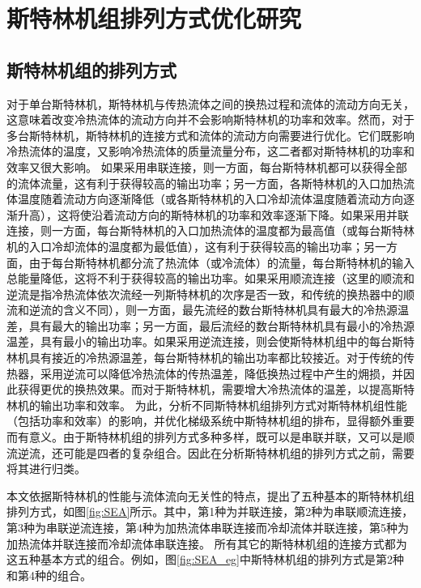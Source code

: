\chapter{斯特林机组排列方式优化研究}
\label{cha:optSEA}

\section{斯特林机组的排列方式}
\label{sec:connectionTypes}
对于单台斯特林机，斯特林机与传热流体之间的换热过程和流体的流动方向无关，这意味着改变冷热流体的流动方向并不会影响斯特林机的功率和效率。然而，对于多台斯特林机，斯特林机的连接方式和流体的流动方向需要进行优化。它们既影响冷热流体的温度，又影响冷热流体的质量流量分布，这二者都对斯特林机的功率和效率又很大影响。
如果采用串联连接，则一方面，每台斯特林机都可以获得全部的流体流量，这有利于获得较高的输出功率；另一方面，各斯特林机的入口加热流体温度随着流动方向逐渐降低（或各斯特林机的入口冷却流体温度随着流动方向逐渐升高），这将使沿着流动方向的斯特林机的功率和效率逐渐下降。如果采用并联连接，则一方面，每台斯特林机的入口加热流体的温度都为最高值（或每台斯特林机的入口冷却流体的温度都为最低值），这有利于获得较高的输出功率；另一方面，由于每台斯特林机都分流了热流体（或冷流体）的流量，每台斯特林机的输入总能量降低，这将不利于获得较高的输出功率。如果采用顺流连接（这里的顺流和逆流是指冷热流体依次流经一列斯特林机的次序是否一致，和传统的换热器中的顺流和逆流的含义不同），则一方面，最先流经的数台斯特林机具有最大的冷热源温差，具有最大的输出功率；另一方面，最后流经的数台斯特林机具有最小的冷热源温差，具有最小的输出功率。如果采用逆流连接，则会使斯特林机组中的每台斯特林机具有接近的冷热源温差，每台斯特林机的输出功率都比较接近。对于传统的传热器，采用逆流可以降低冷热流体的传热温差，降低换热过程中产生的㶲损，并因此获得更优的换热效果。而对于斯特林机，需要增大冷热流体的温差，以提高斯特林机的输出功率和效率。
为此，分析不同斯特林机组排列方式对斯特林机组性能（包括功率和效率）的影响，并优化梯级系统中斯特林机组的排布，显得额外重要而有意义。由于斯特林机组的排列方式多种多样，既可以是串联并联，又可以是顺流逆流，还可能是四者的复杂组合。因此在分析斯特林机组的排列方式之前，需要将其进行归类。

本文依据斯特林机的性能与流体流向无关性的特点，提出了五种基本的斯特林机组排列方式，如图\ref{fig:SEA}所示。其中，第1种为并联连接，第2种为串联顺流连接，第3种为串联逆流连接，第4种为加热流体串联连接而冷却流体并联连接，第5种为加热流体并联连接而冷却流体串联连接。
所有其它的斯特林机组的连接方式都为这五种基本方式的组合。例如，图\ref{fig:SEA_eg}中斯特林机组的排列方式是第2种和第4种的组合。

